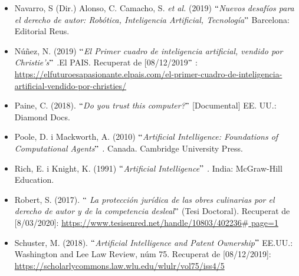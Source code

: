 \documentclass[12pt]{article}
\begin{document}
\begin{itemize}
\vspace{\baselineskip}
	\item Navarro, S (Dir.) Alonso, C. Camacho, S. \textit{et al.} (2019) $``$\textit{Nuevos desafíos para el derecho de autor: Robótica, Inteligencia Artificial, Tecnología$"$  }Barcelona: Editorial Reus.\par


\vspace{\baselineskip}
	\item Núñez, N. (2019) $``$\textit{El Primer cuadro de inteligencia artificial, vendido por Christie’s$"$ .}El PAIS. Recuperat de [08/12/2019$"$ : \href{https://elfuturoesapasionante.elpais.com/el-primer-cuadro-de-inteligencia-artificial-vendido-por-christies/}{https://elfuturoesapasionante.elpais.com/el-primer-cuadro-de-inteligencia-artificial-vendido-por-christies/}\par


\vspace{\baselineskip}
	\item Paine, C. (2018). $``$\textit{Do you trust this computer?$"$  }[Documental] EE. UU.: Diamond Docs.\par


\vspace{\baselineskip}
	\item Poole, D. i Mackworth, A. (2010) $``$\textit{Artificial Intelligence: Foundations of Computational Agents$"$ . }Canada. Cambridge University Press.\par


\vspace{\baselineskip}
	\item Rich, E. i Knight, K. (1991) $``$\textit{Artificial Intelligence$"$ . }India:\textit{ }McGraw-Hill Education. \par


\vspace{\baselineskip}
	\item Robert, S. (2017). $``$ \textit{La protección jurídica de las obres culinarias por el derecho de autor y de la competencia desleal$"$  }(Tesi Doctoral). Recuperat de [8/03/2020]: \href{https://www.tesisenred.net/handle/10803/402236}{\textcolor[HTML]{0000FF}{\ul{https://www.tesisenred.net/handle/10803/402236$\#$ page=1}}}\par


\vspace{\baselineskip}
	\item Schuster, M. (2018). $``$\textit{Artificial Intelligence and Patent Ownership$"$ } EE.UU.: Washington and Lee Law Review, núm 75. Recuperat de [08/12/2019]: \href{https://scholarlycommons.law.wlu.edu/wlulr/vol75/iss4/5}{https://scholarlycommons.law.wlu.edu/wlulr/vol75/iss4/5}\par



\end{itemize}
\end{document}
